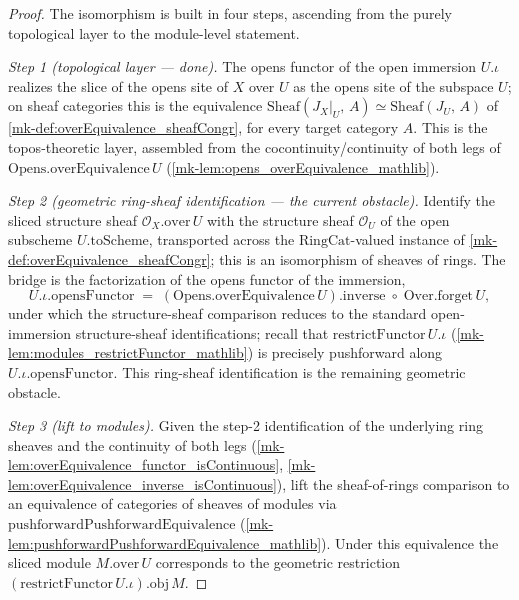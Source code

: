 \begin{proof}
  The isomorphism is built in four steps, ascending from the purely topological layer to the
  module-level statement.

  \emph{Step 1 (topological layer --- done).} The opens functor of the open immersion
  \(U.\iota\) realizes the slice of the opens site of \(X\) over \(U\) as the opens site of the
  subspace \(U\); on sheaf categories this is the equivalence
  \(\mathrm{Sheaf}(J_X|_U,\,A) \simeq \mathrm{Sheaf}(J_U,\,A)\) of
  \ref{mk-def:overEquivalence_sheafCongr}, for every target category \(A\). This is the
  topos-theoretic layer, assembled from the cocontinuity/continuity of both legs of
  \(\mathrm{Opens.overEquivalence}\,U\) (\ref{mk-lem:opens_overEquivalence_mathlib}).

  \emph{Step 2 (geometric ring-sheaf identification --- the current obstacle).} Identify the
  sliced structure sheaf \(\mathcal{O}_X.\mathrm{over}\,U\) with the structure sheaf
  \(\mathcal{O}_{U}\) of the open subscheme \(U.\mathrm{toScheme}\), transported across the
  \(\mathrm{RingCat}\)-valued instance of \ref{mk-def:overEquivalence_sheafCongr}; this is an
  isomorphism of sheaves of rings. The bridge is the factorization of the opens functor of the
  immersion,
  \[
    U.\iota.\mathrm{opensFunctor}
      \;=\; (\mathrm{Opens.overEquivalence}\,U).\mathrm{inverse}
        \;\circ\; \mathrm{Over.forget}\,U ,
  \]
  under which the structure-sheaf comparison reduces to the standard open-immersion
  structure-sheaf identifications; recall that \(\mathrm{restrictFunctor}\,U.\iota\)
  (\ref{mk-lem:modules_restrictFunctor_mathlib}) is precisely pushforward along
  \(U.\iota.\mathrm{opensFunctor}\). This ring-sheaf identification is the remaining geometric
  obstacle.

  \emph{Step 3 (lift to modules).} Given the step-2 identification of the underlying ring sheaves
  and the continuity of both legs (\ref{mk-lem:overEquivalence_functor_isContinuous},
  \ref{mk-lem:overEquivalence_inverse_isContinuous}), lift the sheaf-of-rings comparison to an
  equivalence of categories of sheaves of modules via
  \(\mathrm{pushforwardPushforwardEquivalence}\)
  (\ref{mk-lem:pushforwardPushforwardEquivalence_mathlib}). Under this equivalence the sliced
  module \(M.\mathrm{over}\,U\) corresponds to the geometric restriction
  \((\mathrm{restrictFunctor}\,U.\iota).\mathrm{obj}\,M\).


\end{proof}
